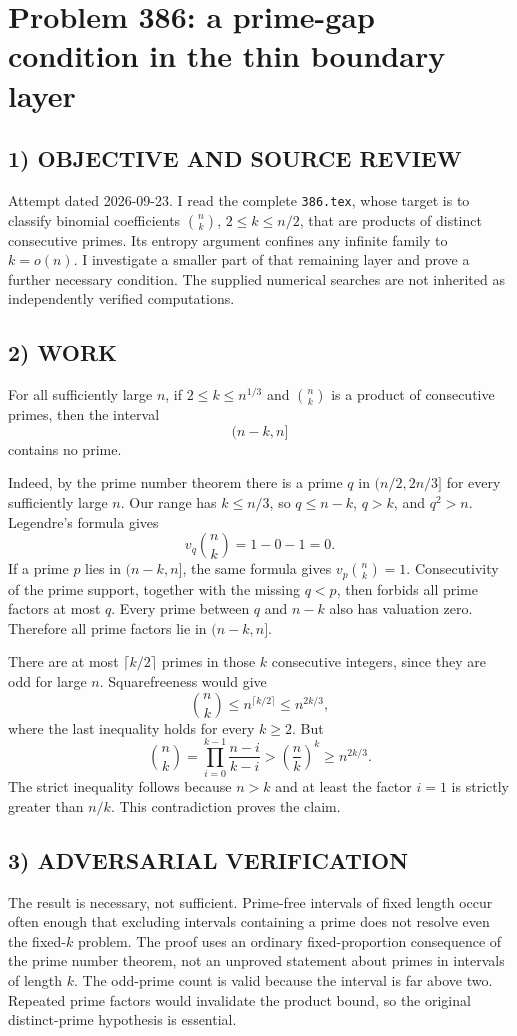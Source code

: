 \section{Problem 386: a prime-gap condition in the thin boundary layer}
\subsection*{1) OBJECTIVE AND SOURCE REVIEW}
Attempt dated 2026-09-23. I read the complete \texttt{386.tex}, whose target is to classify binomial coefficients $\binom nk$, $2\le k\le n/2$, that are products of distinct consecutive primes. Its entropy argument confines any infinite family to $k=o(n)$. I investigate a smaller part of that remaining layer and prove a further necessary condition. The supplied numerical searches are not inherited as independently verified computations.
\subsection*{2) WORK}
For all sufficiently large $n$, if $2\le k\le n^{1/3}$ and $\binom nk$ is a product of consecutive primes, then the interval
\[
(n-k,n]
\]
contains no prime.

Indeed, by the prime number theorem there is a prime $q$ in $(n/2,2n/3]$ for every sufficiently large $n$. Our range has $k\le n/3$, so $q\le n-k$, $q>k$, and $q^2>n$. Legendre's formula gives
\[
v_q\binom nk=1-0-1=0.
\]
If a prime $p$ lies in $(n-k,n]$, the same formula gives $v_p\binom nk=1$. Consecutivity of the prime support, together with the missing $q<p$, then forbids all prime factors at most $q$. Every prime between $q$ and $n-k$ also has valuation zero. Therefore all prime factors lie in $(n-k,n]$.

There are at most $\lceil k/2\rceil$ primes in those $k$ consecutive integers, since they are odd for large $n$. Squarefreeness would give
\[
\binom nk\le n^{\lceil k/2\rceil}\le n^{2k/3},
\]
where the last inequality holds for every $k\ge2$. But
\[
\binom nk=\prod_{i=0}^{k-1}\frac{n-i}{k-i}
>\left(\frac nk\right)^k\ge n^{2k/3}.
\]
The strict inequality follows because $n>k$ and at least the factor $i=1$ is strictly greater than $n/k$. This contradiction proves the claim.
\subsection*{3) ADVERSARIAL VERIFICATION}
The result is necessary, not sufficient. Prime-free intervals of fixed length occur often enough that excluding intervals containing a prime does not resolve even the fixed-$k$ problem. The proof uses an ordinary fixed-proportion consequence of the prime number theorem, not an unproved statement about primes in intervals of length $k$. The odd-prime count is valid because the interval is far above two. Repeated prime factors would invalidate the product bound, so the original distinct-prime hypothesis is essential.
